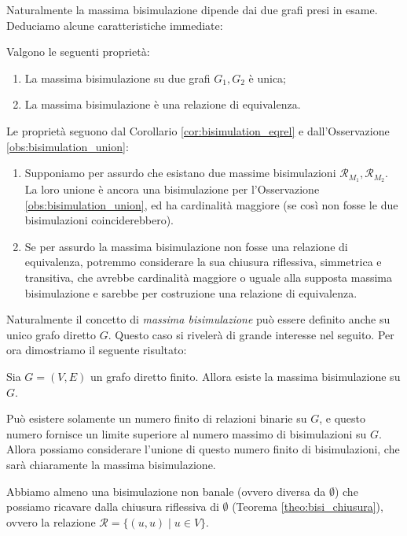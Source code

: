 Naturalmente la massima bisimulazione dipende dai due grafi presi in esame. Deduciamo alcune caratteristiche immediate:
\begin{proposition}
    Valgono le seguenti proprietà:
    \begin{enumerate}
        \item La massima bisimulazione su due grafi $G_1,G_2$ è unica;
        \item La massima bisimulazione è una relazione di equivalenza.
    \end{enumerate}
    \vspace*{-0.3cm}
    \label{prop:bisi_max_equi}
\end{proposition}
\begin{proof2}
    Le proprietà seguono dal Corollario \ref{cor:bisimulation_eqrel} e dall'Osservazione \ref{obs:bisimulation_union}:
    \begin{enumerate}
        \item Supponiamo per assurdo che esistano due massime bisimulazioni $\mathcal{R}_{M_1}, \mathcal{R}_{M_2}$. La loro unione è ancora una bisimulazione per l'Osservazione \ref{obs:bisimulation_union}, ed ha cardinalità maggiore (se così non fosse le due bisimulazioni coinciderebbero).
        \item Se per assurdo la massima bisimulazione non fosse una relazione di equivalenza, potremmo considerare la sua chiusura riflessiva, simmetrica e transitiva, che avrebbe cardinalità maggiore o uguale alla supposta massima bisimulazione e sarebbe per costruzione una relazione di equivalenza.
    \end{enumerate}
    \vspace*{-0.7cm}
\end{proof2}
Naturalmente il concetto di \emph{massima bisimulazione} può essere definito anche su unico grafo diretto $G$. Questo caso si rivelerà di grande interesse nel seguito. Per ora dimostriamo il seguente risultato:
\begin{theorem}
    Sia $G=(V,E)$ un grafo diretto finito. Allora esiste la massima bisimulazione su $G$.
\end{theorem}
\begin{proof2}
    Può esistere solamente un numero finito di relazioni binarie su $G$, e questo numero fornisce un limite superiore al numero massimo di bisimulazioni su $G$.
    Allora possiamo considerare l'unione di questo numero finito di bisimulazioni, che sarà chiaramente la massima bisimulazione.

    Abbiamo almeno una bisimulazione non banale (ovvero diversa da $\emptyset$) che possiamo ricavare dalla chiusura riflessiva di $\emptyset$ (Teorema \ref{theo:bisi_chiusura}), ovvero la relazione $\mathcal{R} = \{(u,u) \mid u \in V\}$.
\end{proof2}

